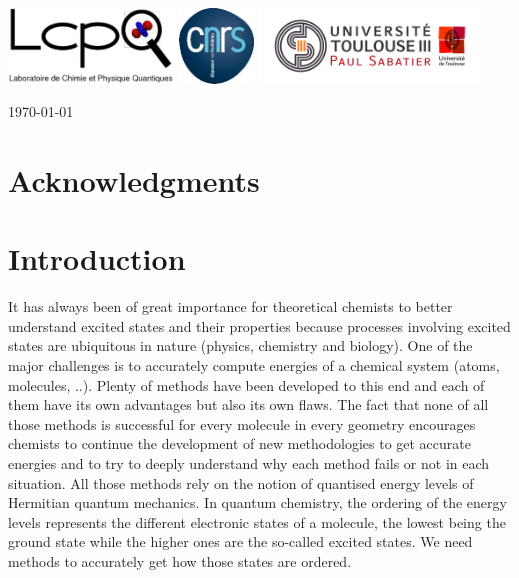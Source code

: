 \documentclass[11pt,a4paper]{article}
\begin{document}
\begin{center}
\vspace{0.5cm}
\includegraphics[height=2cm]{LCPQ_logo.pdf} \hfill \includegraphics[height=2cm]{LogoCNRS.eps} \hfill \includegraphics[height=2cm]{UPS_logo.jpg}

\end{center}

\vfill
\hfill \today

\newpage

\section*{Acknowledgments}

\tableofcontents

\newpage

\section{Introduction}

It has always been of great importance for theoretical chemists to better understand excited states and their properties because processes involving excited states are ubiquitous in nature (physics, chemistry and biology). One of the major challenges is to accurately compute energies of a chemical system (atoms, molecules, ..). Plenty of methods have been developed to this end and each of them have its own advantages but also its own flaws. The fact that none of all those methods is successful for every molecule in every geometry encourages chemists to continue the development of new methodologies to get accurate energies and to try to deeply understand why each method fails or not in each situation. All those methods rely on the notion of quantised energy levels of Hermitian quantum mechanics. In quantum chemistry, the ordering of the energy levels represents the different electronic states of a molecule, the lowest being the ground state while the higher ones are the so-called excited states. We need methods to accurately get how those states are ordered.
\end{document}
